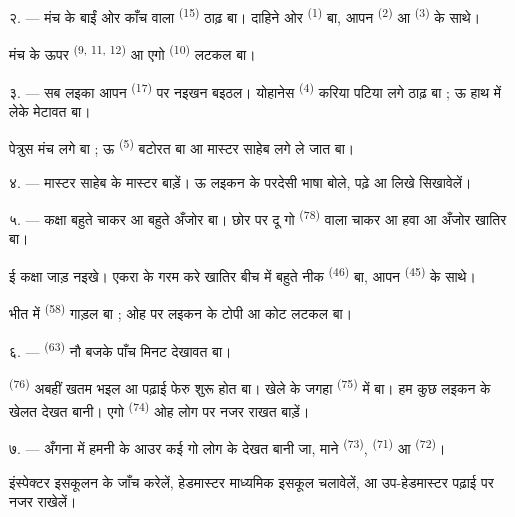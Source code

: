 २. --- मंच के बाईं ओर काँच वाला  \textsuperscript{(15)}
ठाढ़ बा। दाहिने ओर  \textsuperscript{(1)} बा, आपन
 \textsuperscript{(2)} आ  \textsuperscript{(3)}
के साथे।

मंच के ऊपर  \textsuperscript{(9, 11, 12)} आ एगो
 \textsuperscript{(10)} लटकल बा।

३. --- सब लइका आपन  \textsuperscript{(17)} पर नइखन बइठल।
योहानेस \textsuperscript{(4)} करिया पटिया लगे ठाढ़ बा ; ऊ 
हाथ में लेके  मेटावत बा।

पेत्रुस मंच लगे बा ; ऊ  \textsuperscript{(5)} बटोरत बा
आ मास्टर साहेब लगे ले जात बा।

४. ---  मास्टर साहेब  के मास्टर बाड़ें। ऊ
लइकन के परदेसी भाषा  बोले, पढ़े आ लिखे सिखावेलें।

५. --- कक्षा बहुते चाकर आ बहुते अँजोर बा। छोर पर दू गो
 \textsuperscript{(78)} वाला चाकर  आ हवा
आ अँजोर खातिर  बा।

ई कक्षा जाड़ नइखे। एकरा के गरम करे खातिर बीच में बहुते नीक
 \textsuperscript{(46)} बा, आपन 
\textsuperscript{(45)} के साथे।

भीत में  \textsuperscript{(58)} गाड़ल बा ; ओह पर
लइकन के टोपी आ कोट लटकल बा।

\VUsaut{5.2mm}
\VUsaut{3.6mm}

६. ---  \textsuperscript{(63)} नौ बजके पाँच मिनट देखावत बा।

 \textsuperscript{(76)} अबहीं खतम भइल आ पढ़ाई फेरु
शुरू होत बा। खेले के जगहा  \textsuperscript{(75)} में बा। हम
कुछ लइकन के खेलत देखत बानी। एगो 
\textsuperscript{(74)} ओह लोग पर नजर राखत बाड़ें।

७. --- अँगना में हमनी के आउर कई गो लोग के देखत बानी जा, माने
 \textsuperscript{(73)}, 
\textsuperscript{(71)} आ  \textsuperscript{(72)}।

इंस्पेक्टर इसकूलन के जाँच करेलें, हेडमास्टर माध्यमिक इसकूल चलावेलें, आ
उप-हेडमास्टर पढ़ाई पर नजर राखेलें।

